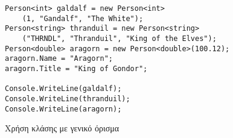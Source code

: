 \begin{listing}[htbp]
\begin{verbatim}
Person<int> galdalf = new Person<int>
    (1, "Gandalf", "The White");
Person<string> thranduil = new Person<string>
    ("THRNDL", "Thranduil", "King of the Elves");
Person<double> aragorn = new Person<double>(100.12);
aragorn.Name = "Aragorn";
aragorn.Title = "King of Gondor";

Console.WriteLine(galdalf);
Console.WriteLine(thranduil);
Console.WriteLine(aragorn);
\end{verbatim}
\caption{Χρήση κλάσης με γενικό όρισμα}
\label{genericsExec}
\end{listing}